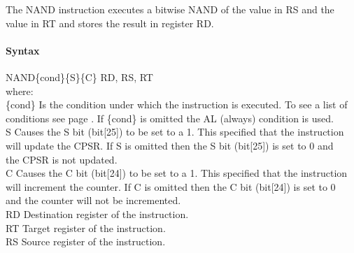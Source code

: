 \documentclass[12pt]{article}
\begin{document}
    \noindent
    The NAND instruction executes a bitwise NAND of the value in RS and the value in RT and stores the result in register RD. 
    
    \paragraph{Syntax}
    \begin{flushleft}
    NAND\{cond\}\{S\}\{C\} RD, RS, RT\\
    \vspace{1em}        %
    where:\\
    \vspace{1em}
    \{cond\}    \hspace{2em} Is the condition under which the instruction is executed. To see a list of\\
                \hspace{5.4em} conditions see page . If \{cond\} is omitted the AL (always) condition is used.\\
    \vspace{1em}    
    S       \hspace{4.5em} Causes the S bit (bit[25]) to be set to a 1. This specified that the instruction\\
            \hspace{5.4em} will update the CPSR. If S is omitted then the S bit (bit[25]) is set to 0 and\\
            \hspace{5.4em} the CPSR is not updated.\\
    \vspace{1em}    
    C       \hspace{4.5em} Causes the C bit (bit[24]) to be set to a 1. This specified that the instruction\\
            \hspace{5.4em} will increment the counter. If C is omitted then the C bit (bit[24]) is set to 0\\
            \hspace{5.4em} and the counter will not be incremented.\\
    \vspace{1em}
    RD  \hspace{3.6em} Destination register of the instruction.\\
    \vspace{1em}
    RT  \hspace{3.7em} Target register of the instruction.\\
    \vspace{1em}
    RS  \hspace{3.85em} Source register of the instruction.\\
    \end{flushleft}
    
\end{document}
